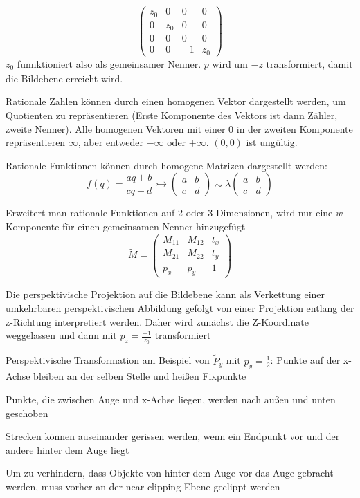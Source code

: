 \documentclass[12pt,landscape]{article}
\begin{document}
\begin{multicols}{3}
\begin{compactitem}
\[\begin{pmatrix}
z_0 & 0 & 0 & 0 \\
0 & z_0 & 0 & 0 \\
0 & 0 & 0 & 0 \\
0 & 0 & -1 & z_0
\end{pmatrix} \]
$z_0$ funnktioniert also als gemeinsamer Nenner. $\underline{p}$ wird um $-z$ transformiert, damit die Bildebene erreicht wird.
\item Rationale Zahlen können durch einen homogenen Vektor dargestellt werden, um Quotienten zu repräsentieren (Erste Komponente des Vektors ist dann Zähler, zweite Nenner). Alle homogenen Vektoren mit einer 0 in der zweiten Komponente repräsentieren $\infty$, aber entweder $-\infty$ oder $+\infty$. $(0,0)$ ist ungültig.
\item Rationale Funktionen können durch homogene Matrizen dargestellt werden:
\[f(q) = \frac{aq + b}{cq + d} \rightarrowtail \begin{pmatrix}
a & b \\ c & d
\end{pmatrix} \eqsim \lambda \begin{pmatrix}
a & b \\ c & d
\end{pmatrix} \]
\item Erweitert man rationale Funktionen auf 2 oder 3 Dimensionen, wird nur eine $w$-Komponente für einen gemeinsamen Nenner hinzugefügt \[\tilde{M} = \begin{pmatrix}
M_{11} & M_{12} & t_x \\
M_{21} & M_{22} & t_y \\
p_x & p_y & 1
\end{pmatrix} \]
\item Die perspektivische Projektion auf die Bildebene kann als Verkettung einer umkehrbaren perspektivischen Abbildung gefolgt von einer Projektion entlang der z-Richtung interpretiert werden. Daher wird zunächst die Z-Koordinate weggelassen und dann mit $p_z = \frac{-1}{z_0}$ transformiert
\item Perspektivische Transformation am Beispiel von $\tilde{P}_y$ mit $p_y = \frac{1}{2}$: Punkte auf der x-Achse bleiben an der selben Stelle und heißen Fixpunkte
\item Punkte, die zwischen Auge und x-Achse liegen, werden nach außen und unten geschoben
\item Strecken können auseinander gerissen werden, wenn ein Endpunkt vor und der andere hinter dem Auge liegt
\item Um zu verhindern, dass Objekte von hinter dem Auge vor das Auge gebracht werden, muss vorher an der near-clipping Ebene geclippt werden

\end{compactitem}
\end{multicols}
\end{document}
